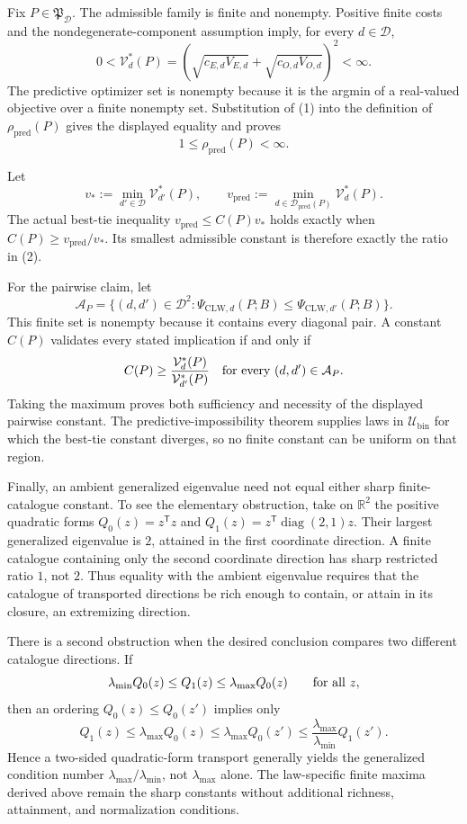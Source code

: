 Fix \(P\in\mathfrak P_{\mathcal D}\).  The admissible family is finite and nonempty.  Positive finite costs and the nondegenerate-component assumption imply, for every \(d\in\mathcal D\),
\[
 0<\mathcal V_d^*(P)
 =\left(\sqrt{c_{E,d}V_{E,d}}+\sqrt{c_{O,d}V_{O,d}}\right)^2<\infty. \tag{1}
\]
The predictive optimizer set is nonempty because it is the argmin of a real-valued objective over a finite nonempty set.  Substitution of (1) into the definition of \(\rho_{\mathrm{pred}}(P)\) gives the displayed equality and proves
\[
 1\le\rho_{\mathrm{pred}}(P)<\infty. \tag{2}
\]

Let
\[
 v_*:=\min_{d'\in\mathcal D}\mathcal V_{d'}^*(P),
 \qquad
 v_{\mathrm{pred}}:=\min_{d\in\mathcal D_{\mathrm{pred}}(P)}\mathcal V_d^*(P).
\]
The actual best-tie inequality \(v_{\mathrm{pred}}\le C(P)v_*\) holds exactly when \(C(P)\ge v_{\mathrm{pred}}/v_*\).  Its smallest admissible constant is therefore exactly the ratio in (2).

For the pairwise claim, let
\[
 \mathcal A_P=\{(d,d')\in\mathcal D^2:
 \Psi_{\mathrm{CLW},d}(P;B)\le
 \Psi_{\mathrm{CLW},d'}(P;B)\}.
\]
This finite set is nonempty because it contains every diagonal pair.  A constant \(C(P)\) validates every stated implication if and only if
\[
 C(P)\ge \frac{\mathcal V_d^*(P)}{\mathcal V_{d'}^*(P)}
 \quad\hbox{for every }(d,d')\in\mathcal A_P.
\]
Taking the maximum proves both sufficiency and necessity of the displayed pairwise constant.  The predictive-impossibility theorem supplies laws in \(\mathcal U_{\mathrm{bin}}\) for which the best-tie constant diverges, so no finite constant can be uniform on that region.

Finally, an ambient generalized eigenvalue need not equal either sharp finite-catalogue constant.  To see the elementary obstruction, take on \(\mathbb R^2\) the positive quadratic forms \(Q_0(z)=z^{\mathsf T}z\) and \(Q_1(z)=z^{\mathsf T}\operatorname{diag}(2,1)z\).  Their largest generalized eigenvalue is \(2\), attained in the first coordinate direction.  A finite catalogue containing only the second coordinate direction has sharp restricted ratio \(1\), not \(2\).  Thus equality with the ambient eigenvalue requires that the catalogue of transported directions be rich enough to contain, or attain in its closure, an extremizing direction.

There is a second obstruction when the desired conclusion compares two different catalogue directions.  If
\[
 \lambda_{\min}Q_0(z)\le Q_1(z)\le\lambda_{\max}Q_0(z)
 \qquad\hbox{for all }z,
\]
then an ordering \(Q_0(z)\le Q_0(z')\) implies only
\[
 Q_1(z)\le\lambda_{\max}Q_0(z)
 \le\lambda_{\max}Q_0(z')
 \le\frac{\lambda_{\max}}{\lambda_{\min}}Q_1(z').
\]
Hence a two-sided quadratic-form transport generally yields the generalized condition number \(\lambda_{\max}/\lambda_{\min}\), not \(\lambda_{\max}\) alone.  The law-specific finite maxima derived above remain the sharp constants without additional richness, attainment, and normalization conditions.